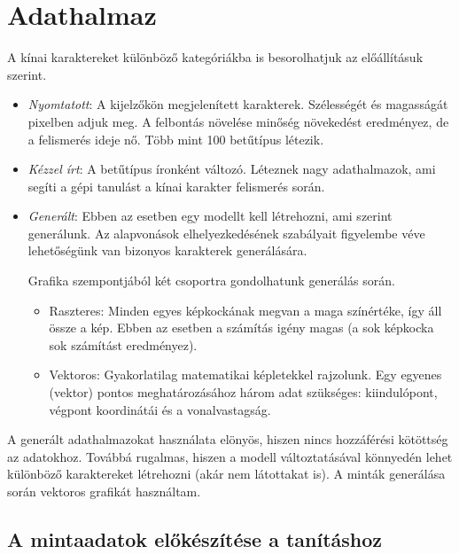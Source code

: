 

\section{Adathalmaz}

A kínai karaktereket különböző kategóriákba is besorolhatjuk az előállításuk szerint.
\begin{itemize}
\item \textit{Nyomtatott}: A kijelzőkön megjelenített karakterek. Szélességét és magasságát pixelben adjuk meg. A felbontás növelése minőség növekedést eredményez, de a felismerés ideje nő. Több mint 100 betűtípus létezik.
\item \textit{Kézzel írt}: A betűtípus íronként változó. Léteznek nagy adathalmazok, ami segíti a gépi tanulást a kínai karakter felismerés során.
\item \textit{Generált}: Ebben az esetben egy modellt kell létrehozni, ami szerint generálunk. Az alapvonások elhelyezkedésének szabályait figyelembe véve lehetőségünk van bizonyos karakterek generálására.

Grafika szempontjából két csoportra gondolhatunk generálás során.
	\begin{itemize}
	\item Raszteres: Minden egyes képkockának megvan a maga színértéke, így áll össze a kép. Ebben az esetben a számítás igény magas (a sok képkocka sok számítást eredményez).
	\item Vektoros: Gyakorlatilag matematikai képletekkel rajzolunk. Egy egyenes (vektor) pontos meghatározásához három adat szükséges: kiindulópont, végpont koordinátái és a vonalvastagság.
	\end{itemize}
\end{itemize}

A generált adathalmazokat használata elönyös, hiszen nincs hozzáférési kötöttség az adatokhoz. Továbbá rugalmas, hiszen a modell változtatásával könnyedén lehet különböző karaktereket létrehozni (akár nem látottakat is). A minták generálása során vektoros grafikát használtam.

\subsection{A mintaadatok előkészítése a tanításhoz}

